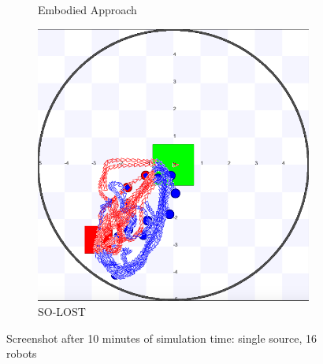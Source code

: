 \documentclass[letterpaper, 10 pt, conference]{ieeeconf}  %
\begin{document}
\begin{figure}[h]
\begin{subfigure}{.23\textwidth}
          \centering
          \caption{Embodied Approach}
     \end{subfigure}
    \centering
     \begin{subfigure}{.23\textwidth}
       \includegraphics[width=0.7\linewidth]{images/so-lost/1/raw/16.png}
          \centering
          \caption{SO-LOST}
     \end{subfigure}
   
   \centering
   \caption{Screenshot after 10 minutes of simulation time: single source, 16 robots}
   \label{fig:screenshot_1_source}
\end{figure}




\end{document}
